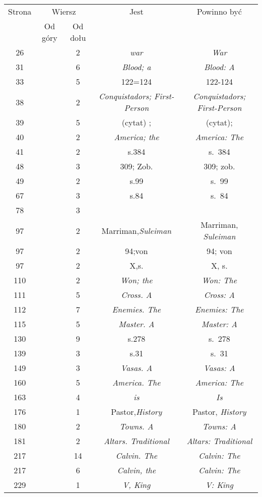 \documentclass[a4paper,11pt]{article}
\begin{document}
\begin{center}

  \begin{tabular}{|c|c|c|c|c|}
    \hline
    Strona & \multicolumn{2}{c|}{Wiersz} & Jest
                              & Powinno być \\ \cline{2-3}
    & Od góry & Od dołu & & \\
    \hline
    26  & &  2 & \textit{war} & \textit{War} \\
    31  & &  6 & \textit{Blood; a} & \textit{Blood: A} \\
    33  & &  5 & 122=124 & 122-124 \\
    38  & &  2 & \textit{Conquistadors; First-Person}
           & \textit{Conquistadors; First-Person} \\
    39  & &  5 & (cytat) ; & (cytat); \\
    40  & &  2 & \textit{America; the} & \textit{America: The} \\
    41  & &  2 & s.384 & s.~384 \\
    48  & &  3 & 309; Zob. & 309; zob. \\
    49  & &  2 & s.99 & s.~99 \\
    67  & &  3 & s.84 & s.~84 \\
    78  & &  3 & & \\
    97  & &  2 & Marriman,\textit{Suleiman} & Marriman, \textit{Suleiman} \\
    97  & &  2 & 94;von & 94; von\\
    97  & &  2 & X,s.& X, s. \\
    110 & &  2 & \textit{Won; the} & \textit{Won: The} \\
    111 & &  5 & \textit{Cross. A} & \textit{Cross: A} \\
    112 & &  7 & \textit{Enemies. The} & \textit{Enemies: The} \\
    115 & &  5 & \textit{Master. A} & \textit{Master: A} \\
    130 & &  9 & s.278 & s.~278 \\
    139 & &  3 & s.31 & s.~31 \\
    149 & &  3 & \textit{Vasas. A} & \textit{Vasas: A} \\
    160 & &  5 & \textit{America. The} & \textit{America: The} \\
    163 & &  4 & \textit{is} & \textit{Is} \\
    176 & &  1 & Pastor,\textit{History} & Pastor, \textit{History} \\
    180 & &  2 & \textit{Towns. A} & \textit{Towns: A} \\
    181 & &  2 & \textit{Altars. Traditional}
           & \textit{Altars: Traditional} \\
    217 & & 14 & \textit{Calvin. The} & \textit{Calvin: The} \\
    217 & &  6 & \textit{Calvin, the} & \textit{Calvin: The} \\
    229 & &  1 & \textit{V, King} & \textit{V: King} \\
    \hline
  \end{tabular}






\end{center}
\end{document}
